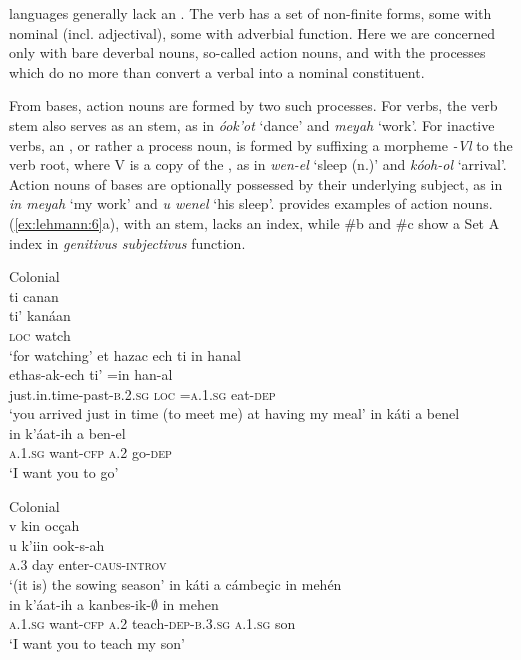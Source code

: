 \documentclass[output=paper]{langsci/langscibook}
\begin{document}
 languages generally lack an . The verb has a set of non-finite forms, some with nominal (incl. adjectival), some with adverbial function. Here we are concerned only with bare deverbal nouns, so-called action nouns, and with the processes which do no more than convert a verbal into a nominal constituent.



From  bases, action nouns are formed by two such processes. For   verbs, the verb stem also serves as an  stem, as in \textit{óok’ot} ‘dance’ and \textit{meyah} ‘work’. For inactive  verbs, an , or rather a process noun, is formed by suffixing a morpheme \textit{{}-Vl} to the verb root, where V is a copy of the , as in \textit{wen-el} ‘sleep (n.)’ and \textit{kóoh-ol} ‘arrival’. Action nouns of  bases are optionally possessed by their underlying subject, as in \textit{in meyah} ‘my work’ and \textit{u wenel} ‘his sleep’.  provides examples of  action nouns. (\ref{ex:lehmann:6}a), with an  stem, lacks an index, while \#b and \#c show a Set A index in \textit{genitivus subjectivus} function.



\ea\label{ex:lehmann:6}
Colonial  \\
\ea 
ti    canan\\
\gll   ti’    kanáan\\
\textsc{loc}  watch\\
\glt ‘for watching’ \citep[14v]{SanBuenaventura1684}
\ex 
et  hazac      ech      ti    in        hanal\\
\gll   ethas-ak-ech          ti’    =in      han-al\\
just.in.time-past-\textsc{b.2.sg}    \textsc{loc}  \textsc{=a.1.sg}    eat-\textsc{dep}\\
\glt ‘you arrived just in time (to meet me) at having my meal’ \citep[§299, p.132]{Beltrán1746}
\ex 
in      káti        a    benel\\
\gll  in      k’áat-ih    a    ben-el\\
  \textsc{a.1.sg}  want-\textsc{cfp}    \textsc{a.2}  go-\textsc{dep}\\
\glt ‘I want you to go’ \citep[51]{Coronel1620}
\z
\z 



\ea\label{ex:lehmann:7}
Colonial  \\
\ea 
v    kin    ocçah\\
\gll   u    k’iin    ook-s-ah\\  
  \textsc{a.3}  day    enter-\textsc{caus-introv}\\
\glt ‘(it is) the sowing season’ \citep[56]{Coronel1620}
\ex 
in      káti        a    cámbeçic        in      mehén\\
\gll   in      k’áat-ih    a    kanbes-ik-${\emptyset}$    in      mehen\\
\textsc{a.1.sg} want-\textsc{cfp}   \textsc{a.2}  teach-\textsc{dep-b.3.sg}  \textsc{a.1.sg}  son\\
\glt ‘I want you to teach my son’ \citep[50]{Coronel1620}
\z
\z 
\end{document}
